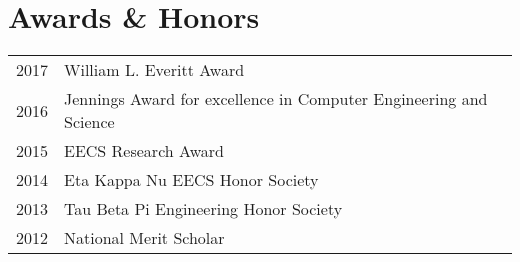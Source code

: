 \documentclass[letterpaper]{deedy-resume} %
\begin{document}
\begin{minipage}[t]{0.66\textwidth}
\sectionspace %


\section{Awards \& Honors}

\begin{tabular}{rll}
2017 & William L. Everitt Award \\
2016 & Jennings Award for excellence in Computer Engineering and Science \\
2015 & EECS Research Award \\
2014 & Eta Kappa Nu EECS Honor Society\\
2013 & Tau Beta Pi Engineering Honor Society\\
2012 & National Merit Scholar
\end{tabular}

\sectionspace %


\end{minipage} %








\end{document}
